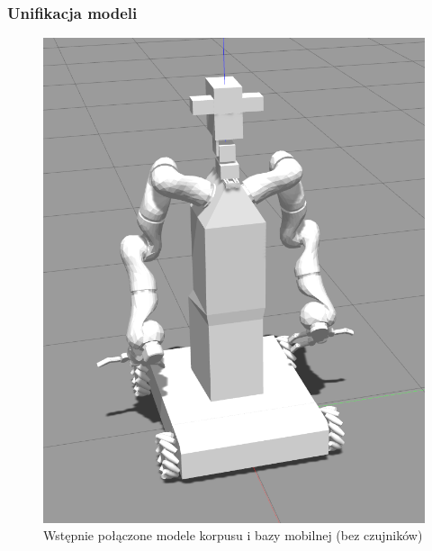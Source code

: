 \begin{frame}
    \frametitle{Unifikacja modeli}
    \begin{figure}
        \includegraphics[scale=0.27]{./images/omnivelmomobil-cropped.png}
        \caption{Wstępnie połączone modele korpusu i bazy mobilnej (bez czujników)}
    \end{figure}
\end{frame}



